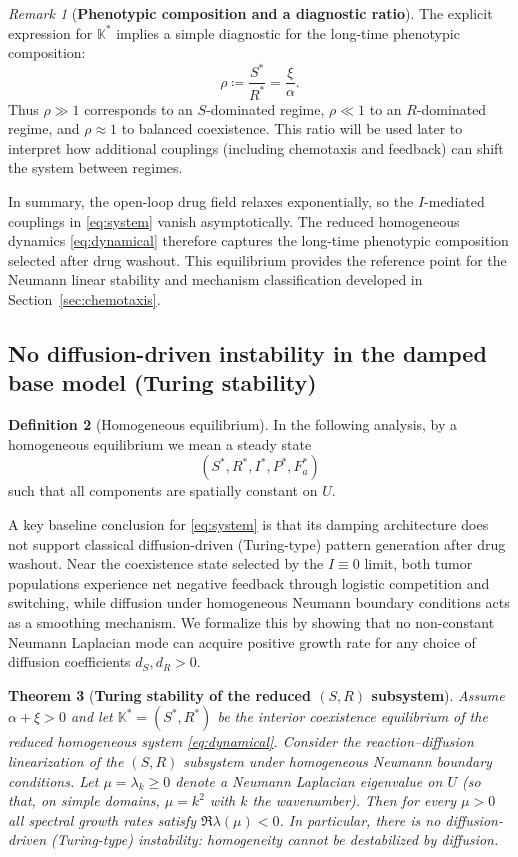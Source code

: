 \documentclass[pdflatex,sn-mathphys-ay]{sn-jnl}
\theoremstyle{thmstyleone}
\newtheorem{theorem}{Theorem}[section]
\theoremstyle{definition}
\newtheorem{definition}[theorem]{Definition}
\theoremstyle{remark}
\newtheorem{remark}[theorem]{Remark}
\begin{document}
\begin{remark}[\textbf{Phenotypic composition and a diagnostic ratio}]
\label{rmk:phy}
The explicit expression for $\mathbb{K}^*$ implies a simple diagnostic for the long-time phenotypic composition:
\[
\rho \coloneqq \frac{S^*}{R^*}=\frac{\xi}{\alpha}.
\]
Thus $\rho\gg 1$ corresponds to an $S$-dominated regime, $\rho\ll 1$ to an $R$-dominated regime, and $\rho\approx 1$ to balanced coexistence. 
This ratio will be used later to interpret how additional couplings (including chemotaxis and feedback) can shift the system between regimes.
\end{remark}

In summary, the open-loop drug field relaxes exponentially, so the $I$-mediated couplings in \eqref{eq:system} vanish asymptotically. 
The reduced homogeneous dynamics \eqref{eq:dynamical} therefore captures the long-time phenotypic composition selected after drug washout. 
This equilibrium provides the reference point for the Neumann linear stability and mechanism classification developed in Section~\ref{sec:chemotaxis}.

\subsection{No diffusion-driven instability in the damped base model (Turing stability)}
\label{subsec:turing_stability}

\begin{definition}[Homogeneous equilibrium]
\label{def:hom_eq}
In the following analysis, by a homogeneous equilibrium we mean a steady state
\[
(S^*,R^*,I^*,P^*,F_a^*)
\]
such that all components are spatially constant on $U$.
\end{definition}

A key baseline conclusion for \eqref{eq:system} is that its damping architecture does not support classical diffusion-driven (Turing-type) pattern generation after drug washout. 
Near the coexistence state selected by the $I\equiv 0$ limit, both tumor populations experience net negative feedback through logistic competition and switching, while diffusion under homogeneous Neumann boundary conditions acts as a smoothing mechanism. 
We formalize this by showing that no non-constant Neumann Laplacian mode can acquire positive growth rate for any choice of diffusion coefficients $d_S,d_R>0$. 

\begin{theorem}[\textbf{Turing stability of the reduced $(S,R)$ subsystem}]
\label{thm:turing}
Assume $\alpha+\xi>0$ and let $\mathbb{K}^*=(S^*,R^*)$ be the interior coexistence equilibrium of the reduced homogeneous system \eqref{eq:dynamical}. 
Consider the reaction--diffusion linearization of the $(S,R)$ subsystem under homogeneous Neumann boundary conditions. 
Let $\mu=\lambda_k\ge 0$ denote a Neumann Laplacian eigenvalue on $U$ (so that, on simple domains, $\mu=k^2$ with $k$ the wavenumber). 
Then for every $\mu>0$ all spectral growth rates satisfy $\Re \lambda(\mu)<0$. 
In particular, there is no diffusion-driven (Turing-type) instability: homogeneity cannot be destabilized by diffusion.
\end{theorem}
\end{document}
